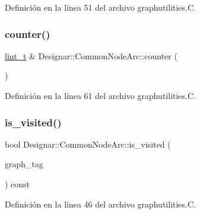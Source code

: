 Definición en la línea 51 del archivo graphutilities.\+C.

\mbox{\label{class_designar_1_1_common_node_arc_a8bdada8dfdf47ad02c91cca8c848d287}} 
\subsubsection{\texorpdfstring{counter()}{counter()}}
{\footnotesize\ttfamily \hyperlink{namespace_designar_a9d113d66a39e82b73727c72cd3a52f73}{lint\+\_\+t} \& Designar\+::\+Common\+Node\+Arc\+::counter (\begin{DoxyParamCaption}{ }\end{DoxyParamCaption})}



Definición en la línea 61 del archivo graphutilities.\+C.

\mbox{\label{class_designar_1_1_common_node_arc_a1852b6cf543bfb695bad590804ecaacd}} 
\subsubsection{\texorpdfstring{is\+\_\+visited()}{is\_visited()}}
{\footnotesize\ttfamily bool Designar\+::\+Common\+Node\+Arc\+::is\+\_\+visited (\begin{DoxyParamCaption}\item[{\hyperlink{namespace_designar_ac91366256ea6ea6ac5fd483d55a7499e}{Graph\+Tag}}]{graph\+\_\+tag }\end{DoxyParamCaption}) const}



Definición en la línea 46 del archivo graphutilities.\+C.

\mbox{\label{class_designar_1_1_common_node_arc_a1dd1385837012b02ee3c67a7e3f5ccc1}} 
